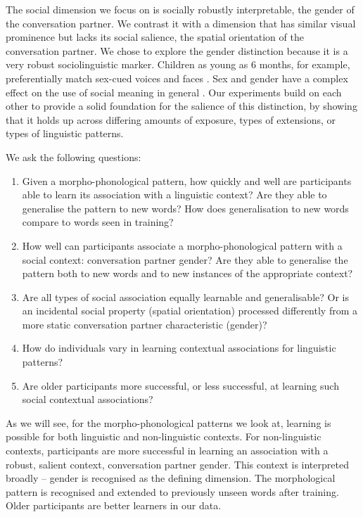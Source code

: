 \documentclass{frontiersSCNS} %
\begin{document}
The social dimension we focus on is socially robustly interpretable, the gender of the conversation partner. We contrast it with a dimension that has similar visual prominence but lacks its social salience, the spatial orientation of the conversation partner. We chose to explore the gender distinction because it is a very robust sociolinguistic marker. Children as young as 6 months, for example, preferentially match sex-cued voices and faces \citep{walker1991infants}. Sex and gender have a complex effect on the use of social meaning in general \citep{cheshire2002sex,milroy1993mechanisms}. Our experiments build on each other to provide a solid foundation for the salience of this distinction, by showing that it holds up across differing amounts of exposure, types of extensions, or types of  linguistic patterns.

We ask the following questions:

\begin{enumerate}
\item Given a morpho-phonological pattern,  how quickly and well are participants
able to learn its association with a linguistic context?   Are they able to generalise the pattern to new words? How does generalisation to new words compare to words seen in training?
\item How well can participants associate a morpho-phonological pattern with a social context: conversation partner gender?  Are they able to generalise the pattern  both to new words and to new instances of the appropriate context? 
\item  Are all types of social association equally learnable and generalisable? Or is an incidental social property (spatial orientation) processed differently from a more static conversation partner characteristic (gender)? 
\item How do individuals vary in learning contextual associations for linguistic patterns?
\item Are older participants more successful, or less successful, at learning such social contextual associations?
\end{enumerate}

As we will see, for the morpho-phonological patterns we look at, learning is possible for both linguistic and non-linguistic contexts. For non-linguistic contexts, participants are more successful in learning an association with a robust, salient context, conversation partner gender. This context is interpreted broadly -- gender is recognised as the defining dimension. The morphological pattern is recognised and extended to previously unseen words after training. Older participants are better learners in our data.
\end{document}
